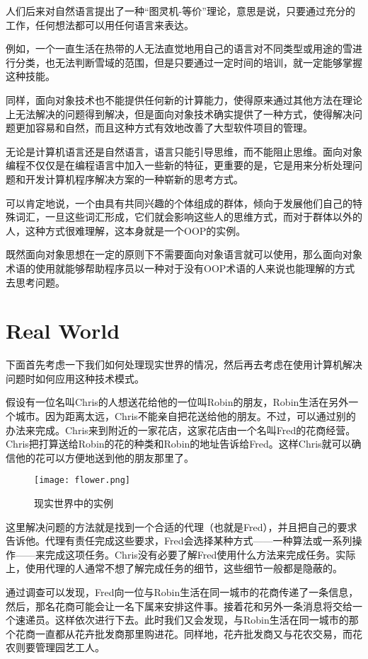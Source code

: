 人们后来对自然语言提出了一种“图灵机-等价”理论，意思是说，只要通过充分的工作，任何想法都可以用任何语言来表达。

例如，一个一直生活在热带的人无法直觉地用自己的语言对不同类型或用途的雪进行分类，也无法判断雪域的范围，但是只要通过一定时间的培训，就一定能够掌握这种技能。

同样，面向对象技术也不能提供任何新的计算能力，使得原来通过其他方法在理论上无法解决的问题得到解决，但是面向对象技术确实提供了一种方式，使得解决问题更加容易和自然，而且这种方式有效地改善了大型软件项目的管理。


无论是计算机语言还是自然语言，语言只能引导思维，而不能阻止思维。面向对象编程不仅仅是在编程语言中加入一些新的特征，更重要的是，它是用来分析处理问题和开发计算机程序解决方案的一种崭新的思考方式。

可以肯定地说，一个由具有共同兴趣的个体组成的群体，倾向于发展他们自己的特殊词汇，一旦这些词汇形成，它们就会影响这些人的思维方式，而对于群体以外的人，这种方式很难理解，这本身就是一个OOP的实例。

既然面向对象思想在一定的原则下不需要面向对象语言就可以使用，那么面向对象术语的使用就能够帮助程序员以一种对于没有OOP术语的人来说也能理解的方式去思考问题。


\chapter{Real World}

下面首先考虑一下我们如何处理现实世界的情况，然后再去考虑在使用计算机解决问题时如何应用这种技术模式。

假设有一位名叫Chris的人想送花给他的一位叫Robin的朋友，Robin生活在另外一个城市。因为距离太远，Chris不能亲自把花送给他的朋友。不过，可以通过别的办法来完成。Chris来到附近的一家花店，这家花店由一个名叫Fred的花商经营。Chris把打算送给Robin的花的种类和Robin的地址告诉给Fred。这样Chris就可以确信他的花可以方便地送到他的朋友那里了。

\begin{figure}[htbp]
\centering
\texttt{[image: flower.png]}
\caption{现实世界中的实例}
\label{fig:flower}
\end{figure}

这里解决问题的方法就是找到一个合适的代理（也就是Fred），并且把自己的要求告诉他。代理有责任完成这些要求，Fred会选择某种方式——一种算法或一系列操作——来完成这项任务。Chris没有必要了解Fred使用什么方法来完成任务。实际上，使用代理的人通常不想了解完成任务的细节，这些细节一般都是隐蔽的。

通过调查可以发现，Fred向一位与Robin生活在同一城市的花商传递了一条信息，然后，那名花商可能会让一名下属来安排这件事。接着花和另外一条消息将交给一个速递员。这样依次进行下去。此时我们又会发现，与Robin生活在同一城市的那个花商一直都从花卉批发商那里购进花。同样地，花卉批发商又与花农交易，而花农则要管理园艺工人。


